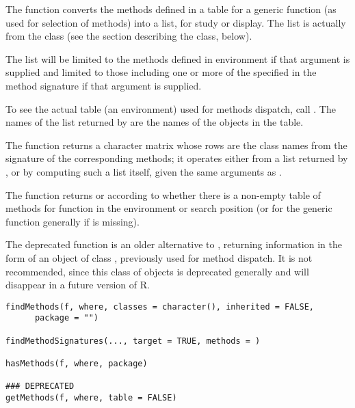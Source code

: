 \begin{Description}\relax
The function  converts the methods defined in a table for a generic
function (as used for selection of methods) into a list, for study or
display.  The list is actually from the class 
(see the section describing the class, below).  


The list will be limited
to the methods defined in environment  if that argument is
supplied and limited to those including one or more of the
specified  in the method signature if that argument is
supplied.

To see the actual table (an environment) used
for methods dispatch, call .
The names of the list returned by  are the names of
the objects in the table.

The function  returns a character matrix
whose rows are the class names from the signature of the corresponding
methods; it operates either from a list returned by
, or by computing such a list itself, given the same
arguments as  .  

The function  returns  or 
according to whether there is a non-empty table of methods for
function  in the environment or search position 
(or for the generic function generally if  is missing).

The deprecated function  is an older alternative to
 , returning information in the form of an object of
class , previously used for method dispatch.  It is
not recommended, since this class of objects is deprecated generally
and will disappear in a future version of R.
\end{Description}
%
\begin{Usage}
\begin{verbatim}
findMethods(f, where, classes = character(), inherited = FALSE,
      package = "")

findMethodSignatures(..., target = TRUE, methods = )

hasMethods(f, where, package)

### DEPRECATED
getMethods(f, where, table = FALSE)
\end{verbatim}
\end{Usage}
%
